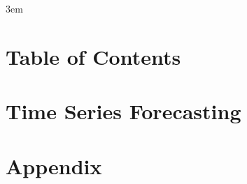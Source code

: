 \documentclass[10pt,twoside]{book}
\begin{document}
\emergencystretch 3em

\frontmatter











\chapter{Table of Contents}
\tableofcontents %
\clearpage

\chapter{Time Series Forecasting}
\clearpage


\chapter{Appendix}
\clearpage

\end{document}
